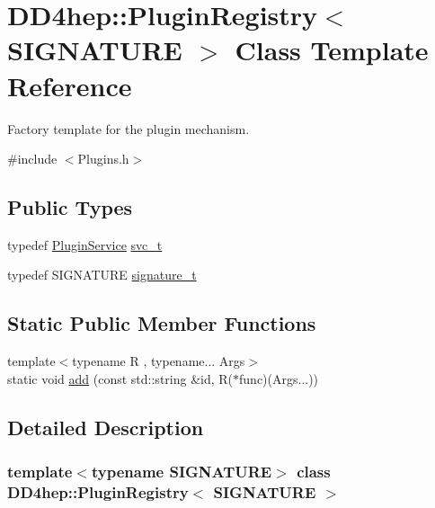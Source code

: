 \hypertarget{class_d_d4hep_1_1_plugin_registry}{}\section{D\+D4hep\+:\+:Plugin\+Registry$<$ S\+I\+G\+N\+A\+T\+U\+RE $>$ Class Template Reference}
\label{class_d_d4hep_1_1_plugin_registry}


Factory template for the plugin mechanism.  




{\ttfamily \#include $<$Plugins.\+h$>$}

\subsection*{Public Types}
\begin{DoxyCompactItemize}
\item 
typedef \hyperlink{class_d_d4hep_1_1_plugin_service}{Plugin\+Service} \hyperlink{class_d_d4hep_1_1_plugin_registry_a4a7136b1696a7da6212af835482dece9}{svc\+\_\+t}
\item 
typedef S\+I\+G\+N\+A\+T\+U\+RE \hyperlink{class_d_d4hep_1_1_plugin_registry_a7027450dd9c05ba16111485082222ade}{signature\+\_\+t}
\end{DoxyCompactItemize}
\subsection*{Static Public Member Functions}
\begin{DoxyCompactItemize}
\item 
{\footnotesize template$<$typename R , typename... Args$>$ }\\static void \hyperlink{class_d_d4hep_1_1_plugin_registry_a6602c60ef4e8ca3fe83709233ca91367}{add} (const std\+::string \&id, R($\ast$func)(Args...))
\end{DoxyCompactItemize}


\subsection{Detailed Description}
\subsubsection*{template$<$typename S\+I\+G\+N\+A\+T\+U\+RE$>$\newline
class D\+D4hep\+::\+Plugin\+Registry$<$ S\+I\+G\+N\+A\+T\+U\+R\+E $>$}

